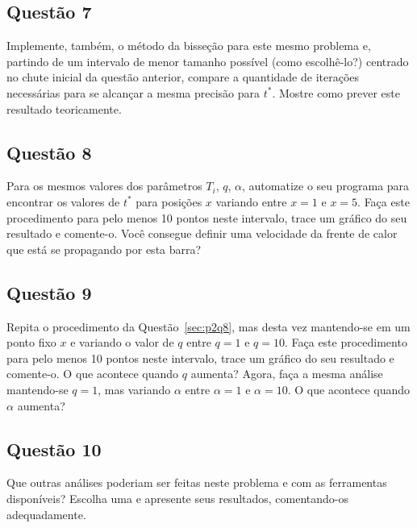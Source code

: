 \documentclass[12pt]{article}
\begin{document}
\subsection*{Questão 7}
\label{sec:p2q7}
Implemente, também, o método da bisseção para este mesmo problema e, partindo de um intervalo de menor tamanho possível (como escolhê-lo?) centrado no chute inicial da questão anterior, compare a quantidade de iterações necessárias para se alcançar a mesma precisão para $t^{*}$. Mostre como prever este resultado teoricamente.

\subsection*{Questão 8}
\label{sec:p2q8}
Para os mesmos valores dos parâmetros $T_{i}$, $q$, $\alpha$, automatize o seu programa para encontrar os valores de $t^{*}$ para posições $x$ variando entre $x = 1$ e $x = 5$. Faça este procedimento para pelo menos 10 pontos neste intervalo, trace um gráfico do seu resultado e comente-o. Você consegue definir uma velocidade da frente de calor que está se propagando por esta barra?

\subsection*{Questão 9}
\label{sec:p2q9}
Repita o procedimento da Questão~\ref{sec:p2q8}, mas desta vez mantendo-se em um ponto fixo $x$ e variando o valor de $q$ entre $q = 1$ e $q = 10$. Faça este procedimento para pelo menos 10 pontos neste intervalo, trace um gráfico do seu resultado e comente-o. O que acontece quando $q$ aumenta? Agora, faça a mesma análise mantendo-se $q = 1$, mas variando $\alpha$ entre $\alpha = 1$ e $\alpha = 10$. O que acontece quando $\alpha$ aumenta?

\subsection*{Questão 10}
\label{sec:p2q10}
Que outras análises poderiam ser feitas neste problema e com as ferramentas disponíveis? Escolha uma e apresente seus resultados, comentando-os adequadamente.
\end{document}
